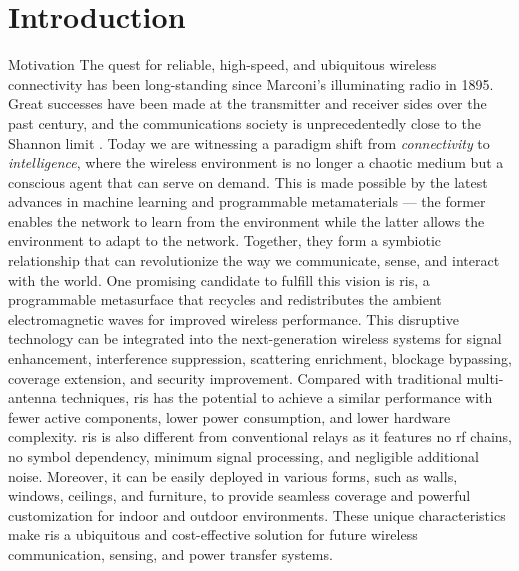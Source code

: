 
\graphicspath{{assets/chapter_1/}}

\chapter{Introduction}

\begin{section}{Motivation}
	The quest for reliable, high-speed, and ubiquitous wireless connectivity has been long-standing since Marconi's illuminating radio in 1895.
	Great successes have been made at the transmitter and receiver sides over the past century, and the communications society is unprecedentedly close to the Shannon limit \cite{Shannon1948}.
	Today we are witnessing a paradigm shift from \emph{connectivity} to \emph{intelligence}, where the wireless environment is no longer a chaotic medium but a conscious agent that can serve on demand.
	This is made possible by the latest advances in machine learning and programmable metamaterials --- the former enables the network to learn from the environment while the latter allows the environment to adapt to the network.
	Together, they form a symbiotic relationship that can revolutionize the way we communicate, sense, and interact with the world.
	One promising candidate to fulfill this vision is \gls{ris}, a programmable metasurface that recycles and redistributes the ambient electromagnetic waves for improved wireless performance.
	This disruptive technology can be integrated into the next-generation wireless systems for signal enhancement, interference suppression, scattering enrichment, blockage bypassing, coverage extension, and security improvement.
	Compared with traditional multi-antenna techniques, \gls{ris} has the potential to achieve a similar performance with fewer active components, lower power consumption, and lower hardware complexity.
	\gls{ris} is also different from conventional relays as it features no \gls{rf} chains, no symbol dependency, minimum signal processing, and negligible additional noise.
	Moreover, it can be easily deployed in various forms, such as walls, windows, ceilings, and furniture, to provide seamless coverage and powerful customization for indoor and outdoor environments.
	These unique characteristics make \gls{ris} a ubiquitous and cost-effective solution for future wireless communication, sensing, and power transfer systems.


\end{section}
